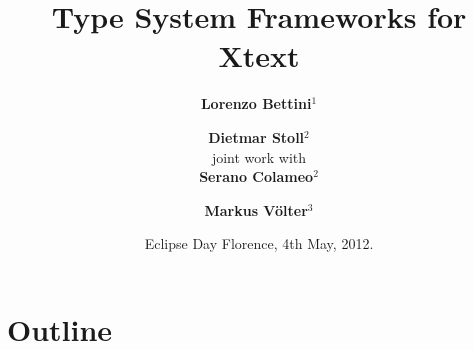 \title{Type System Frameworks for Xtext}
\author{\textbf{Lorenzo Bettini}$^1$ \and \textbf{Dietmar Stoll}$^2$\\
joint work with\\
\textbf{Serano Colameo}$^2$ \and \textbf{Markus V\"olter}$^3$}
\date{Eclipse Day Florence, 4th May, 2012.}


\maketitle

\section*{Outline}
\begin{frame}
   \tableofcontents
\end{frame}










